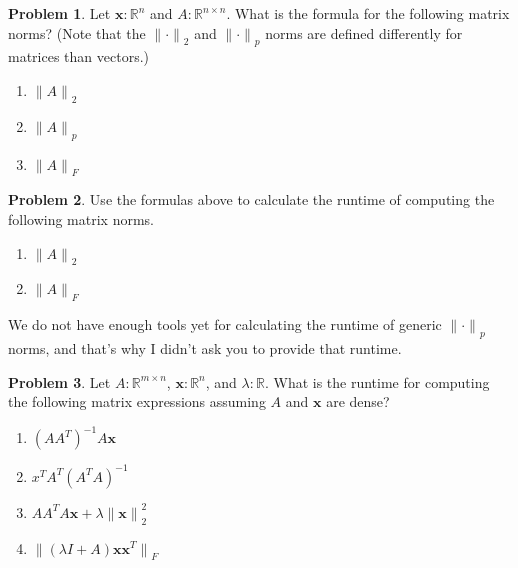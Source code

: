 \documentclass[10pt]{article}
\theoremstyle{definition}
\newtheorem{problem}{Problem}
\newcommand{\R}{\mathbb R}
\newcommand{\trans}[1]{{#1}^{T}}
\newcommand{\x}{\mathbf x}
\newcommand{\ltwo}[1]{{\lVert {#1} \rVert}_2}
\newcommand{\lp}[1]{{\lVert {#1} \rVert}_p}
\newcommand{\lF}[1]{{\lVert {#1} \rVert}_F}
\begin{document}
\begin{problem}
    Let $\x : \R^n$
    and 
    $A : \R^{n\times n}$.
    What is the formula for the following matrix norms?
    (Note that the $\ltwo{\cdot}$ and $\lp{\cdot}$ norms are defined differently for matrices than vectors.)
    \begin{enumerate}
        \item $\ltwo{A}$
            \vspace{2in}
        \item $\lp{A}$
            \vspace{2in}
        \item $\lF{A}$
            \vspace{2in}
    \end{enumerate}
\end{problem}

\newpage
\begin{problem}
    Use the formulas above to calculate the runtime of computing the following matrix norms.
    \begin{enumerate}
        \item $\ltwo{A}$
            \vspace{2in}
        \item $\lF{A}$
            \vspace{2in}
    \end{enumerate}
    We do not have enough tools yet for calculating the runtime of generic $\lp{\cdot}$ norms,
    and that's why I didn't ask you to provide that runtime.
\end{problem}

\begin{problem}
    Let $A : \R^{m \times n}$, $\x : \R^n$, and $\lambda : \R$.
    What is the runtime for computing the following matrix expressions assuming $A$ and $\x$ are dense?
    \begin{enumerate}
        \item $(A \trans A)^{-1} A \x$
            \vspace{2in}
        \item $\trans x \trans A (\trans A A)^{-1}$
            \vspace{2in}
        \item $A \trans A A \x + \lambda \ltwo{\x}^2$
            \vspace{2in}
        \item $\lF{(\lambda I + A) \x \trans \x}$
            \vspace{2in}
    \end{enumerate}
\end{problem}
\end{document}
